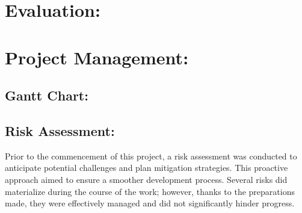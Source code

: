 \documentclass{article}
\begin{document}
\section{Evaluation:}


 



\section{Project Management: }

\subsection{Gantt Chart: }

\subsection{Risk Assessment: }


Prior to the commencement of this project, a risk assessment was conducted to anticipate potential challenges and plan mitigation strategies. This proactive approach aimed to ensure a smoother development process. Several risks did materialize during the course of the work; however, thanks to the preparations made, they were effectively managed and did not significantly hinder progress.\\
\end{document}
